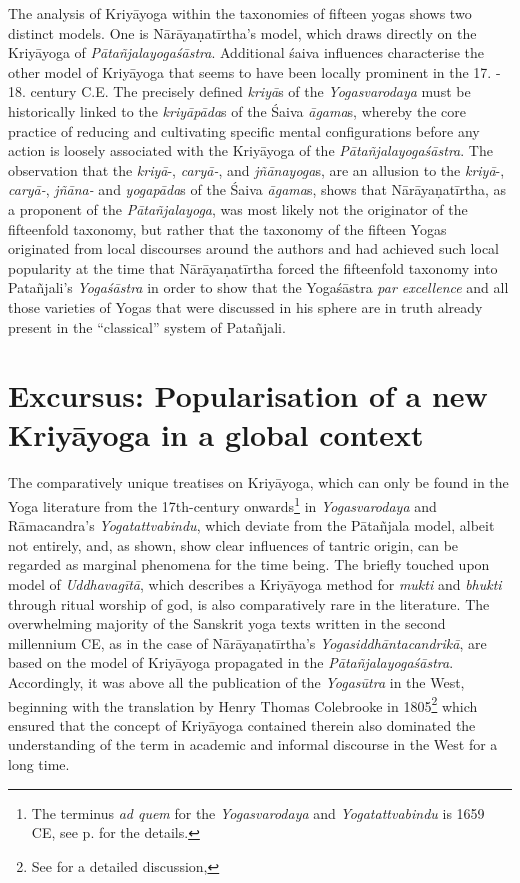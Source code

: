 The analysis of Kriyāyoga within the taxonomies of fifteen yogas shows two distinct models. One is Nārāyaṇatīrtha's model, which draws directly on the Kriyāyoga of \textit{Pātañjalayogaśāstra}. Additional śaiva influences characterise the other model of Kriyāyoga that seems to have been locally prominent in the 17. - 18. century C.E. The precisely defined \textit{kriyā}s of the \textit{Yogasvarodaya} must be historically linked to the \textit{kriyāpāda}s of the Śaiva \textit{āgama}s, whereby the core practice of reducing and cultivating specific mental configurations before any action is loosely associated with the Kriyāyoga of the \textit{Pātañjalayogaśāstra}. The observation that the \textit{kriyā}-, \textit{caryā-}, and \textit{jñānayoga}s, are an allusion to the \textit{kriyā}-, \textit{caryā-}, \textit{jñāna-} and \textit{yogapāda}s of the Śaiva \textit{āgama}s, shows that Nārāyaṇatīrtha, as a proponent of the \textit{Pātañjalayoga}, was most likely not the originator of the fifteenfold taxonomy, but rather that the taxonomy of the fifteen Yogas originated from local discourses around the authors and had achieved such local popularity at the time that Nārāyaṇatīrtha forced the fifteenfold taxonomy into Patañjali's \textit{Yogaśāstra} in order to show that the Yogaśāstra \textit{par excellence} and all those varieties of Yogas that were discussed in his sphere are in truth already present in the ``classical'' system of Patañjali.

\section{Excursus: Popularisation of a new Kriyāyoga in a global context}
\label{excursus}
The comparatively unique treatises on Kriyāyoga, which can only be found in the Yoga literature from the 17th-century onwards\footnote{The terminus \textit{ad quem} for the \textit{Yogasvarodaya} and \textit{Yogatattvabindu} is 1659 CE, see p.\pageref{dating} for the details.} in \textit{Yogasvarodaya} and Rāmacandra's \textit{Yogatattvabindu}, which deviate from the Pātañjala model, albeit not entirely, and, as shown, show clear influences of tantric origin, can be regarded as marginal phenomena for the time being. The briefly touched upon model of \textit{Uddhavagītā}, which describes a Kriyāyoga method for \textit{mukti} and \textit{bhukti} through ritual worship of god, is also comparatively rare in the literature. The overwhelming majority of the Sanskrit yoga texts written in the second millennium CE, as in the case of Nārāyaṇatīrtha's \textit{Yogasiddhāntacandrikā}, are based on the model of Kriyāyoga propagated in the \textit{Pātañjalayogaśāstra}. Accordingly, it was above all the publication of the \textit{Yogasūtra} in the West, beginning with the translation by Henry Thomas Colebrooke in 1805\footnote{See \parencite{colebrooke2014} for a detailed discussion,} which ensured that the concept of Kriyāyoga contained therein also dominated the understanding of the term in academic and informal discourse in the West for a long time. 

